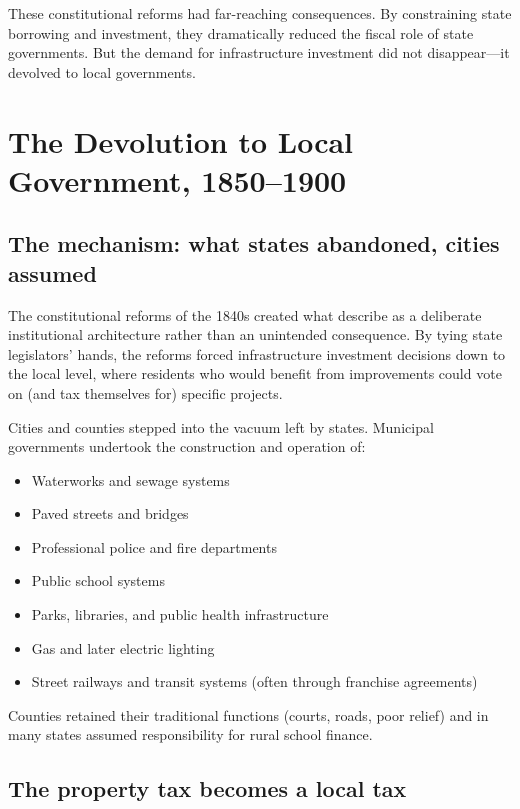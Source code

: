 \documentclass[12pt]{article}
\begin{document}
These constitutional reforms had far-reaching consequences.  By constraining state borrowing and investment, they dramatically reduced the fiscal role of state governments.  But the demand for infrastructure investment did not disappear---it devolved to local governments.


\section{The Devolution to Local Government, 1850--1900}

\subsection{The mechanism: what states abandoned, cities assumed}

The constitutional reforms of the 1840s created what \citet{walliswein2008} describe as a deliberate institutional architecture rather than an unintended consequence.  By tying state legislators' hands, the reforms forced infrastructure investment decisions down to the local level, where residents who would benefit from improvements could vote on (and tax themselves for) specific projects.

Cities and counties stepped into the vacuum left by states.  Municipal governments undertook the construction and operation of:

\begin{itemize}
    \item Waterworks and sewage systems
    \item Paved streets and bridges
    \item Professional police and fire departments
    \item Public school systems
    \item Parks, libraries, and public health infrastructure
    \item Gas and later electric lighting
    \item Street railways and transit systems (often through franchise agreements)
\end{itemize}

Counties retained their traditional functions (courts, roads, poor relief) and in many states assumed responsibility for rural school finance.

\subsection{The property tax becomes a local tax}
\end{document}
